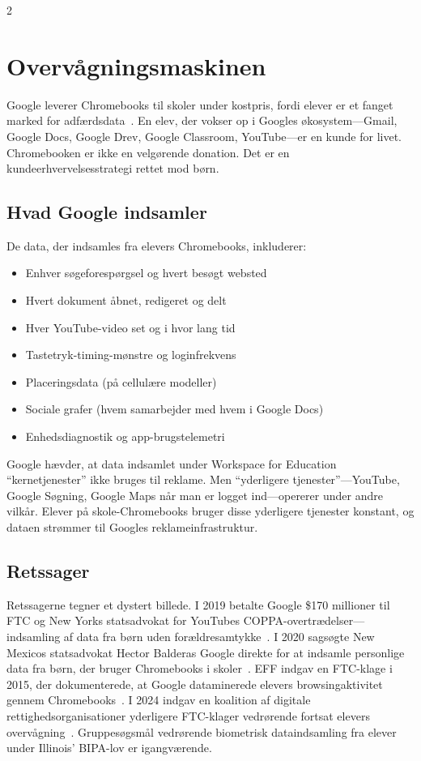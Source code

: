 \documentclass[11pt, a4paper]{article}
\begin{document}
\begin{multicols}{2}
\section{Overvågningsmaskinen}
\label{sec:surveillance}

Google leverer Chromebooks til skoler under kostpris, fordi elever er et fanget marked for adfærdsdata~\citep{zuboff2019surveillance, doctorow2020attack}. En elev, der vokser op i Googles økosystem---Gmail, Google Docs, Google Drev, Google Classroom, YouTube---er en kunde for livet. Chromebooken er ikke en velgørende donation. Det er en kundeerhvervelsesstrategi rettet mod børn.

\subsection{Hvad Google indsamler}

De data, der indsamles fra elevers Chromebooks, inkluderer:

\begin{itemize}
  \item Enhver søgeforespørgsel og hvert besøgt websted
  \item Hvert dokument åbnet, redigeret og delt
  \item Hver YouTube-video set og i hvor lang tid
  \item Tastetryk-timing-mønstre og loginfrekvens
  \item Placeringsdata (på cellulære modeller)
  \item Sociale grafer (hvem samarbejder med hvem i Google Docs)
  \item Enhedsdiagnostik og app-brugstelemetri
\end{itemize}

Google hævder, at data indsamlet under Workspace for Education ``kernetjenester'' ikke bruges til reklame. Men ``yderligere tjenester''---YouTube, Google Søgning, Google Maps når man er logget ind---opererer under andre vilkår. Elever på skole-Chromebooks bruger disse yderligere tjenester konstant, og dataen strømmer til Googles reklameinfrastruktur.

\subsection{Retssager}

Retssagerne tegner et dystert billede. I 2019 betalte Google \$170 millioner til FTC og New Yorks statsadvokat for YouTubes COPPA-overtrædelser---indsamling af data fra børn uden forældresamtykke~\citep{google2019coppa}. I 2020 sagsøgte New Mexicos statsadvokat Hector Balderas Google direkte for at indsamle personlige data fra børn, der bruger Chromebooks i skoler~\citep{newmexico2020google}. EFF indgav en FTC-klage i 2015, der dokumenterede, at Google dataminerede elevers browsingaktivitet gennem Chromebooks~\citep{eff2015chromebook}. I 2024 indgav en koalition af digitale rettighedsorganisationer yderligere FTC-klager vedrørende fortsat elevers overvågning~\citep{eff2024monitoring}. Gruppesøgsmål vedrørende biometrisk dataindsamling fra elever under Illinois' BIPA-lov er igangværende.


\end{multicols}
\end{document}
